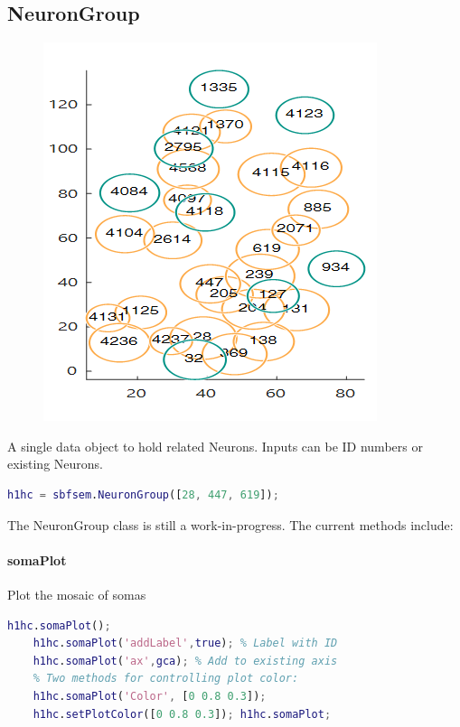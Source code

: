 \documentclass[12pt]{exam}
\begin{document}
	\subsection{NeuronGroup} 
	\begin{figure}
		\includegraphics[width=\linewidth]{h1h2mosaic}
	\end{figure}
	A single data object to hold related Neurons. Inputs can be ID numbers or existing Neurons.
	\begin{lstlisting}[language=matlab]
	h1hc = sbfsem.NeuronGroup([28, 447, 619]);\end{lstlisting} 
	The NeuronGroup class is still a work-in-progress. The current methods include:
	
	\paragraph{somaPlot} Plot the mosaic of somas
	\begin{lstlisting}[language=matlab]
	h1hc.somaPlot();
	h1hc.somaPlot('addLabel',true); % Label with ID
	h1hc.somaPlot('ax',gca); % Add to existing axis
	% Two methods for controlling plot color:
	h1hc.somaPlot('Color', [0 0.8 0.3]);
	h1hc.setPlotColor([0 0.8 0.3]); h1hc.somaPlot;\end{lstlisting}
\end{document}
